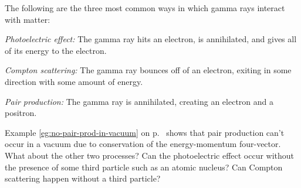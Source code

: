 The following are the three most common ways in which gamma rays interact with matter:

\emph{Photoelectric effect:} The gamma ray hits an electron, is annihilated, and gives all of its energy to the electron.

\emph{Compton scattering:} The gamma ray bounces off of an electron, exiting in some direction with some amount of energy.

\emph{Pair production:} The gamma ray is annihilated, creating an electron and a positron.

\noindent Example \ref{eg:no-pair-prod-in-vacuum} on p.~\pageref{eg:no-pair-prod-in-vacuum} shows
that pair production can't occur in a vacuum due to conservation of the energy-momentum
four-vector. What about the other two processes? Can the photoelectric effect occur without the
presence of some third particle such as an atomic nucleus? Can Compton scattering happen
without a third particle?
